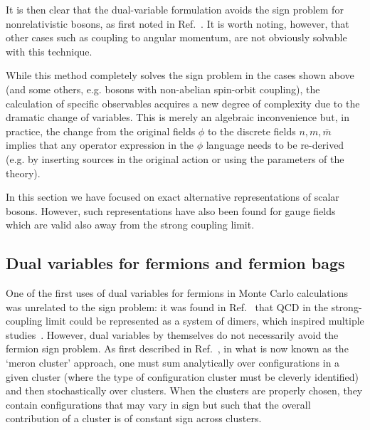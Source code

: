 \documentclass[../main.tex]{subfiles}
\begin{document}
It is then clear that the dual-variable formulation avoids the sign problem for nonrelativistic bosons, as first noted in Ref.~\cite{PhysRevD.75.065012}.
It is worth noting, however, that other cases such as coupling to angular momentum, are not obviously solvable with this technique.

While this method completely solves the sign problem in the cases shown above (and some others, e.g. bosons with non-abelian spin-orbit coupling), the calculation
of specific observables acquires a new degree of complexity due to the dramatic change of variables. This is merely an algebraic
inconvenience but, in practice, the change from the original fields $\phi$ to the discrete fields $n,m,\bar{m}$ implies that any operator expression
in the $\phi$ language needs to be re-derived (e.g. by inserting sources in the original action or using the parameters of the theory).

In this section we have focused on exact alternative representations of scalar bosons. However, such representations have also been found for gauge
fields~\cite{Vairinhos:2014uxa, Vairinhos:2015ewa} which are valid also away from the strong coupling limit.

\subsection{Dual variables for fermions and fermion bags}

One of the first uses of dual variables for fermions in Monte Carlo calculations was unrelated to the sign problem: it was found in
Ref.~\cite{ROSSI1984105} that QCD in the strong-coupling limit could be represented as a system of dimers, which
inspired multiple studies~\cite{WOLFF2009491, WOLFF2009549, WOLFF2010254, WOLFF2010520, PhysRevLett.104.112005,Unger:2011it}.
However, dual variables by themselves do not necessarily avoid the fermion sign problem. As first described in Ref.~\cite{PhysRevLett.83.3116},
in what is now known as the `meron cluster' approach, one must sum analytically over configurations in a given cluster (where the type of configuration
cluster must be cleverly identified) and then stochastically over clusters. When the clusters are properly chosen, they contain configurations that may vary
in sign but such that the overall contribution of a cluster is of constant sign across clusters.
\end{document}
